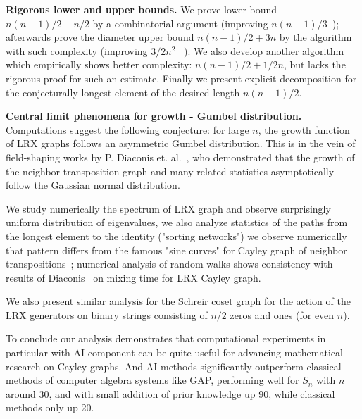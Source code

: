 \documentclass[atmp]{ipart_v1}
\numberwithin{equation}{section}
\theoremstyle{plain}%
\begin{document}
{\bf Rigorous lower and upper bounds.} We prove lower bound $n(n-1)/2 - n/2$  by a combinatorial argument (improving $n(n-1)/3$~\cite{babai1989small}); afterwards prove the diameter  upper bound   $n(n-1)/2 +3n$ by the algorithm  with such complexity (improving $3/2n^2$ ~\cite{kuppili2020upper}). %
We also develop another algorithm which empirically shows better complexity:  $n(n-1)/2 + 1/2n$, but lacks the rigorous proof for such an estimate.  
Finally we present explicit decomposition  for the conjecturally longest element of the desired  length $n(n-1)/2$. 

{\bf Central limit phenomena for growth - Gumbel distribution.} 
Computations suggest the following conjecture: for large 
$n$, the growth function of LRX graphs follows an asymmetric Gumbel distribution. This is in the vein of field-shaping works by P. Diaconis et. al.~\cite{diaconis1977spearman, diaconis1988metrics,chatterjee2017central}, who demonstrated that the growth of the neighbor transposition graph and many related statistics asymptotically follow the Gaussian normal distribution.

We study numerically the spectrum of LRX graph and observe surprisingly uniform distribution of eigenvalues, we also analyze statistics of the paths from the longest element to the identity ("sorting networks") we observe numerically that pattern differs from the famous "sine curves" for Cayley graph of neighbor transpositions~\cite{angel2007random}; 
numerical analysis of random walks shows consistency with results of Diaconis~\cite{diaconis1993comparison} on mixing time for LRX Cayley graph. 

We also present similar analysis for the Schreir coset graph for the action of the LRX generators on binary strings consisting of $n/2$ zeros and ones (for even $n$). %

To conclude our analysis demonstrates that computational experiments in particular with AI component can be quite useful for advancing mathematical research on Cayley graphs. And AI methods significantly outperform classical methods of computer algebra systems like GAP, performing well for  $S_n$ with $n$ around 30, and with small addition of prior knowledge up 90, while classical methods only up 20. 


\end{document}
